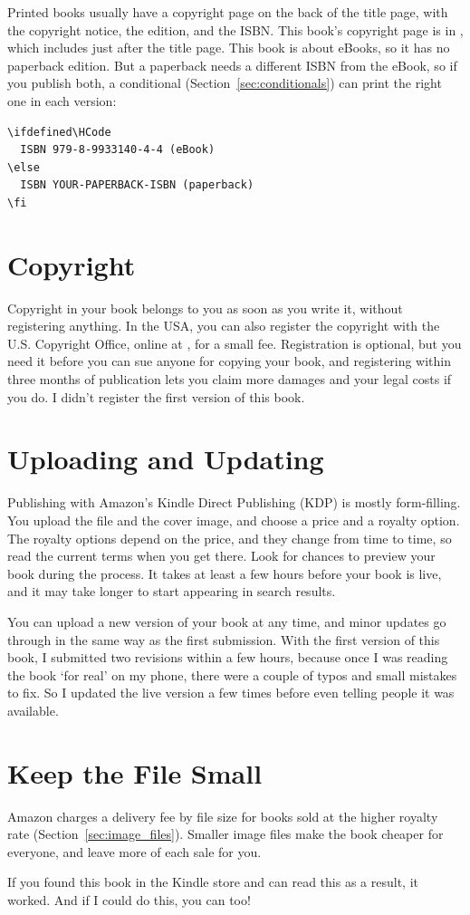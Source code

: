 Printed books usually have a copyright page on the back of the title page, with the copyright notice, the edition, and the ISBN.
This book's copyright page is in , which  includes just after the title page.
This book is about eBooks, so it has no paperback edition.
But a paperback needs a different ISBN from the eBook, so if you publish both, a conditional (Section~\ref{sec:conditionals}) can print the right one in each version:

\begin{Verbatim}[fontsize=\small]
\ifdefined\HCode
  ISBN 979-8-9933140-4-4 (eBook)
\else
  ISBN YOUR-PAPERBACK-ISBN (paperback)
\fi
\end{Verbatim}

\section{Copyright}

Copyright in your book belongs to you as soon as you write it, without registering anything.
In the USA, you can also register the copyright with the U.S. Copyright Office, online at , for a small fee.
Registration is optional, but you need it before you can sue anyone for copying your book, and registering within three months of publication lets you claim more damages and your legal costs if you do.
I didn't register the first version of this book.

\section{Uploading and Updating}

Publishing with Amazon's Kindle Direct Publishing (KDP) is mostly form-filling.
You upload the  file and the cover image, and choose a price and a royalty option.
The royalty options depend on the price, and they change from time to time, so read the current terms when you get there.
Look for chances to preview your book during the process.
It takes at least a few hours before your book is live, and it may take longer to start appearing in search results.

You can upload a new version of your book at any time, and minor updates go through in the same way as the first submission.
With the first version of this book, I submitted two revisions within a few hours, because once I was reading the book `for real' on my phone, there were a couple of typos and small mistakes to fix.
So I updated the live version a few times before even telling people it was available.

\section{Keep the File Small}

Amazon charges a delivery fee by file size for books sold at the higher royalty rate (Section~\ref{sec:image_files}).
Smaller image files make the book cheaper for everyone, and leave more of each sale for you.

If you found this book in the Kindle store and can read this as a result, it worked.
And if I could do this, you can too!
